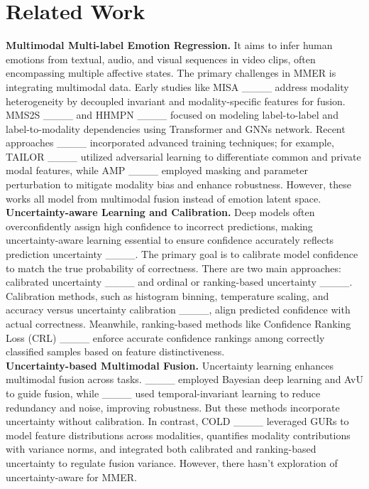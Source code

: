 \section{Related Work}
\textbf{Multimodal Multi-label Emotion Regression.} It aims to infer human emotions from textual, audio, and visual sequences in video clips, often encompassing multiple affective states. The primary challenges in MMER is integrating multimodal data. Early studies like MISA ____ address modality heterogeneity by decoupled invariant and modality-specific features for fusion. MMS2S ____ and HHMPN ____ focused on modeling label-to-label and label-to-modality dependencies using Transformer and GNNs network. Recent approaches ____ incorporated advanced training techniques; for example, TAILOR ____ utilized adversarial learning to differentiate common and private modal features, while AMP ____ employed masking and parameter perturbation to mitigate modality bias and enhance robustness. However, these works all model from multimodal fusion instead of emotion latent space. \\
\textbf{Uncertainty-aware Learning and Calibration.} Deep models often overconfidently assign high confidence to incorrect predictions, making uncertainty-aware learning essential to ensure confidence accurately reflects prediction uncertainty ____. The primary goal is to calibrate model confidence to match the true probability of correctness. There are two main approaches: calibrated uncertainty ____ and ordinal or ranking-based uncertainty ____. Calibration methods, such as histogram binning, temperature scaling, and accuracy versus uncertainty calibration ____, align predicted confidence with actual correctness. Meanwhile, ranking-based methods like Confidence Ranking Loss (CRL) ____ enforce accurate confidence rankings among correctly classified samples based on feature distinctiveness.\\
\textbf{Uncertainty-based Multimodal Fusion.} Uncertainty learning enhances multimodal fusion across tasks. ____ employed Bayesian deep learning and AvU to guide fusion, while ____ used temporal-invariant learning to reduce redundancy and noise, improving robustness. But these methods incorporate uncertainty without calibration. In contrast, COLD ____ leveraged GURs to model feature distributions across modalities, quantifies modality contributions with variance norms, and integrated both calibrated and ranking-based uncertainty to regulate fusion variance. However, there hasn't exploration of uncertainty-aware for MMER.